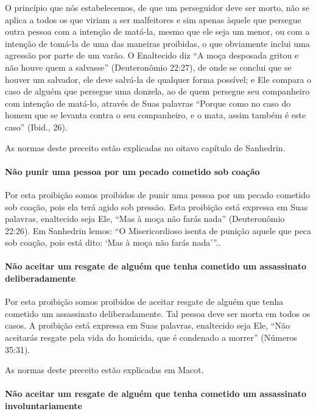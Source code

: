 O princípio que nós estabelecemos, de que um perseguidor deve ser morto,
não se aplica a todos os que viriam a ser malfeitores e sim apenas
àquele que persegue outra pessoa com a intenção de matá-la, mesmo que
ele seja um menor, ou com a intenção de tomá-la de uma das maneiras
proibidas, o que obviamente inclui uma agressão por parte de um varão. O
Enaltecido diz ``A moça desposada gritou e não houve quem a salvasse''
(Deuteronômio 22:27), de onde se conclui que se houver um salvador, ele
deve salvá-la de qualquer forma possível; e Ele compara o caso de alguém
que persegue uma donzela, ao de quem persegue seu companheiro com
intenção de matá-lo, através de Suas palavras ``Porque como no caso do
homem que se levanta contra o seu companheiro, e o mata, assim também é
este caso'' (Ibid., 26).

As normas deste preceito estão explicadas no oitavo capítulo de Sanhedrin.

\paragraph{Não punir uma pessoa por um pecado cometido sob coação}

Por esta proibição somos proibidos de punir uma pessoa por um pecado
cometido sob coação, pois ela terá agido sob pressão. Esta proibição
está expressa em Suas palavras, enaltecido seja Ele, ``Mas à moça não
farás nada'' (Deuteronômio 22:26). Em Sanhedrin lemos: ``O
Misericordioso isenta de punição aquele que peca sob coação, pois está
dito: `Mas à moça não farás nada'''..

\paragraph{Não aceitar um resgate de alguém que tenha cometido um assassinato deliberadamente}

Por esta proibição somos proibidos de aceitar resgate de alguém que
tenha cometido um assassinato deliberadamente. Tal pessoa deve ser morta
em todos os casos. A proibição está expressa em Suas palavras, enaltecido
seja Ele, ``Não aceitarás resgate pela vida do homicida, que é condenado
a morrer'' (Números 35:31).

As normas deste preceito estão explicadas em Macot.

\paragraph{Não aceitar um resgate de alguém que tenha cometido um assassinato involuntariamente}

